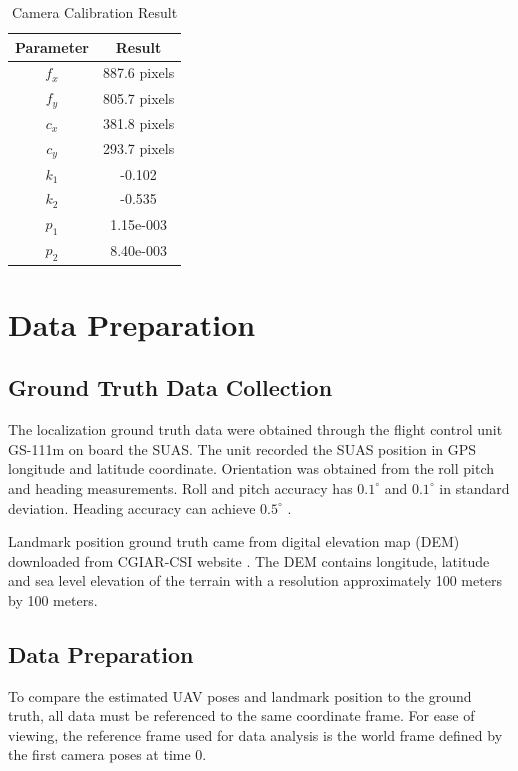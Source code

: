 \begin{table}[h]
\caption{Camera Calibration Result}
\label{tab:camcalresult}
\centering
\begin{tabular}{|c|c|}
\hline
Parameter & Result\\ \hline
$f_x$ & 887.6 pixels \\ \hline
$f_y$ & 805.7 pixels\\ \hline
$c_x$ & 381.8 pixels\\ \hline
$c_y$ & 293.7 pixels\\ \hline
$k_1$ & -0.102 \\ \hline
$k_2$ & -0.535 \\ \hline
$p_1$ & 1.15e-003 \\ \hline
$p_2$ & 8.40e-003 \\
\hline
\end{tabular}
\end{table}
\FloatBarrier

\section{Data Preparation}
\subsection{Ground Truth Data Collection}
The localization ground truth data were obtained through the flight
control unit GS-111m on board the SUAS. The unit recorded the SUAS
position in GPS longitude and latitude coordinate. Orientation was
obtained from the roll pitch and heading measurements. Roll and pitch
accuracy has $0.1^\circ$ and $0.1^\circ$ in standard deviation.
Heading accuracy can achieve $0.5^\circ$ \cite{_athena_????}.

Landmark position ground truth came from digital elevation map (DEM)
downloaded from CGIAR-CSI website \cite{_cgiar-csi_????}. The DEM
contains longitude, latitude and sea level elevation of the terrain
with a resolution approximately 100 meters by 100 meters. 


\subsection{Data Preparation}
To compare the estimated UAV poses and landmark position to the ground
truth, all data must be referenced to the same coordinate frame. For
ease of viewing, the reference frame used for data analysis is the
world frame defined by the first camera poses at time 0. 

